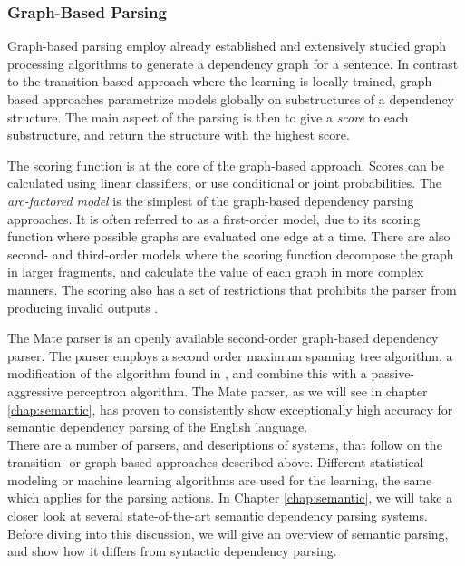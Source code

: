 \subsubsection{Graph-Based Parsing}
\label{ssc:background:graph-based-parsing}
Graph-based parsing employ already established and extensively studied graph processing algorithms to generate a dependency graph for a sentence. In contrast to the transition-based approach where the learning is locally trained, graph-based approaches parametrize models globally on substructures of a dependency structure. The main aspect of the parsing is then to give a \textit{score} to each substructure, and return the structure with the highest score. 

The scoring function is at the core of the graph-based approach. Scores can be calculated using linear classifiers, or use conditional or joint probabilities. The \textit{arc-factored model} is the simplest of the graph-based dependency parsing approaches. It is often referred to as a first-order model, due to its scoring function where possible graphs are evaluated one edge at a time. There are also second- and third-order models where the scoring function decompose the graph in larger fragments, and calculate the value of each graph in more complex manners. The scoring also has a set of restrictions that prohibits the parser from producing invalid outputs \cite{KublerEtAl:09}.

The Mate parser \cite{Boh:10} is an openly available second-order graph-based dependency parser. The parser employs a second order maximum spanning tree algorithm, a modification of the algorithm found in , and combine this with a passive-aggressive perceptron algorithm. The Mate parser, as we will see in chapter \ref{chap:semantic}, has proven to consistently show exceptionally high accuracy for semantic dependency parsing of the English language.\\

\noindent There are a number of parsers, and descriptions of systems, that follow on the transition- or graph-based approaches described above. Different statistical modeling or machine learning algorithms are used for the learning, the same which applies for the parsing actions. In Chapter \ref{chap:semantic}, we will take a closer look at several state-of-the-art semantic dependency parsing systems. Before diving into this discussion, we will give an overview of semantic parsing, and show how it differs from syntactic dependency parsing.


